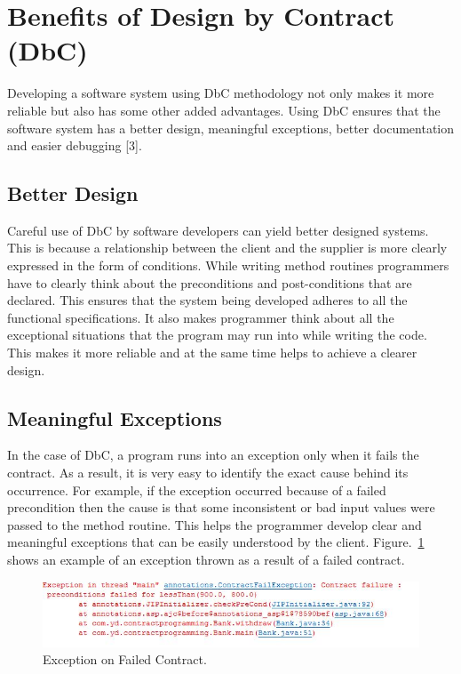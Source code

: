 \section{Benefits of Design by Contract (DbC)}

Developing a software system using DbC methodology not only makes it more reliable but also has some other added advantages. Using DbC ensures that the software system has a better design, meaningful exceptions, better documentation and easier debugging [3].

\subsection{Better Design}
Careful use of DbC by software developers can yield better designed systems. This is because a relationship between the client and the supplier is more clearly expressed in the form of conditions. While writing method routines programmers have to clearly think about the preconditions and post-conditions that are declared. This ensures that the system being developed adheres to all the functional specifications. It also makes programmer think about all the exceptional situations that the program may run into while writing the code. This makes it more reliable and at the same time helps to achieve a clearer design.

\subsection{Meaningful Exceptions}
In the case of DbC, a program runs into an exception only when it fails the contract. As a result, it is very easy to identify the exact cause behind its occurrence. For example, if the exception occurred because of a failed precondition then the cause is that some inconsistent or bad input values were passed to the method routine. This helps the programmer develop clear and meaningful exceptions that can be easily understood by the client.
Figure.~\ref{fig:FailedContract} shows an example of an exception thrown as a result of a failed contract. 
\linebreak
\linebreak
\begin{figure}[htb]
\centering
\includegraphics[width=1.0\textwidth]{images/ContractFailedException.PNG}
\caption{Exception on Failed Contract.} 
\label{fig:FailedContract}
\end{figure}

